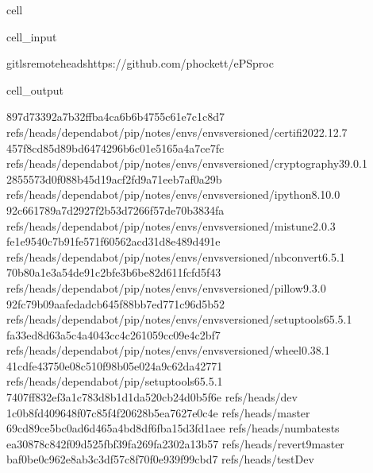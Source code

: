 \documentclass[letterpaper,table,10pt,english]{jupyterBook}
\begin{document}
\begin{sphinxuseclass}{cell}\begin{sphinxVerbatimInput}

\begin{sphinxuseclass}{cell_input}
\begin{sphinxVerbatim}[commandchars=\\\{\}]
gitls\PYGZhy{}remote\PYGZhy{}\PYGZhy{}headshttps://github.com/phockett/ePSproc
\end{sphinxVerbatim}

\end{sphinxuseclass}\end{sphinxVerbatimInput}
\begin{sphinxVerbatimOutput}

\begin{sphinxuseclass}{cell_output}
\begin{sphinxVerbatim}[commandchars=\\\{\}]
897d73392a7b32ffba4ca6b6b4755c61e7c1c8d7	refs/heads/dependabot/pip/notes/envs/envs\PYGZhy{}versioned/certifi\PYGZhy{}2022.12.7
457f8cd85d89bd6474296b6c01e5165a4a7ce7fc	refs/heads/dependabot/pip/notes/envs/envs\PYGZhy{}versioned/cryptography\PYGZhy{}39.0.1
2855573d0f088b45d19acf2fd9a71eeb7af0a29b	refs/heads/dependabot/pip/notes/envs/envs\PYGZhy{}versioned/ipython\PYGZhy{}8.10.0
92c661789a7d2927f2b53d7266f57de70b3834fa	refs/heads/dependabot/pip/notes/envs/envs\PYGZhy{}versioned/mistune\PYGZhy{}2.0.3
fe1e9540c7b91fe571f60562acd31d8e489d491e	refs/heads/dependabot/pip/notes/envs/envs\PYGZhy{}versioned/nbconvert\PYGZhy{}6.5.1
70b80a1e3a54de91c2bfe3b6be82d611fcfd5f43	refs/heads/dependabot/pip/notes/envs/envs\PYGZhy{}versioned/pillow\PYGZhy{}9.3.0
92fc79b09aafedadcb645f88bb7ed771c96d5b52	refs/heads/dependabot/pip/notes/envs/envs\PYGZhy{}versioned/setuptools\PYGZhy{}65.5.1
fa33ed8d63a5c4a4043cc4c261059cc09e4c2bf7	refs/heads/dependabot/pip/notes/envs/envs\PYGZhy{}versioned/wheel\PYGZhy{}0.38.1
41cdfe43750e08c510f98b05e024a9c62da42771	refs/heads/dependabot/pip/setuptools\PYGZhy{}65.5.1
7407ff832ef3a1c783d8b1d1da520cb24d0b5f6e	refs/heads/dev
1c0b8fd409648f07c85f4f20628b5ea7627e0c4e	refs/heads/master
69cd89ce5bc0ad6d465a4bd8df6fba15d3fd1aee	refs/heads/numba\PYGZhy{}tests
ea30878c842f09d525fbf39fa269fa2302a13b57	refs/heads/revert\PYGZhy{}9\PYGZhy{}master
baf0be0c962e8ab3c3df57c8f70f0e939f99cbd7	refs/heads/testDev
\end{sphinxVerbatim}

\end{sphinxuseclass}\end{sphinxVerbatimOutput}

\end{sphinxuseclass}
\end{document}
